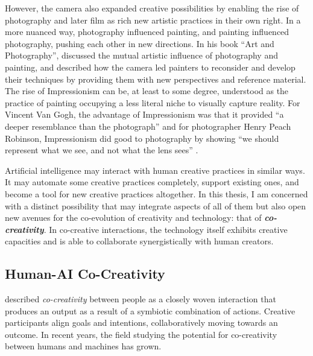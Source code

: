 However, the camera also expanded creative possibilities by enabling the rise of photography and later film as rich new artistic practices in their own right. In a more nuanced way, photography influenced painting, and painting influenced photography, pushing each other in new directions. In his book ``Art and Photography'', \citet{Scharf1968-na} discussed the mutual artistic influence of photography and painting, and described how the camera led painters to reconsider and develop their techniques by providing them with new perspectives and reference material. The rise of Impressionism can be, at least to some degree, understood as the practice of painting occupying a less literal niche to visually capture reality. For Vincent Van Gogh, the advantage of Impressionism was that it provided ``a deeper resemblance than the photograph'' \citep[p. 116]{Marmor1997-ka} and for photographer Henry Peach Robinson, Impressionism did good to photography by showing ``we should represent what we see, and not what the lens sees'' \citep[p. 87]{Robinson1896-mo}. 

Artificial intelligence may interact with human creative practices in similar ways. It may automate some creative practices completely, support existing ones, and become a tool for new creative practices altogether. In this thesis, I am concerned with a distinct possibility that may integrate aspects of all of them but also open new avenues for the co-evolution of creativity and technology: that of \textit{\textbf{co-creativity}}. In co-creative interactions, the technology itself exhibits creative capacities and is able to collaborate synergistically with human creators.

\subsection{Human-AI Co-Creativity}

\citet{Candy2002-ra} described \textit{co-creativity} between people as a closely woven interaction that produces an output as a result of a symbiotic combination of actions. Creative participants align goals and intentions, collaboratively moving towards an outcome. In recent years, the field studying the potential for co-creativity between humans and machines has grown. 

